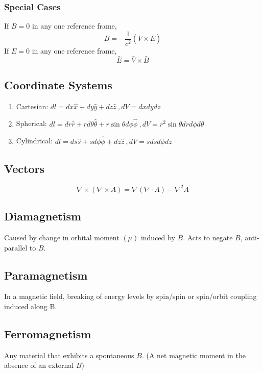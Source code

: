 \documentclass[10pt,letter]{article}
\begin{document}
\subsubsection{Special Cases}
If $B=0$ in any one reference frame, 
\begin{equation}
  \bar{B} = -\frac{1}{c^2}(\bar{V} \times \bar{E})
\end{equation}
If $E=0 $ in any one reference frame,
\begin{equation}
 \bar{E} = \bar{V} \times \bar{B} 
\end{equation}

\subsection{Coordinate Systems}
\begin{enumerate}
    \item Cartesian: $dl = dx\hat{x} + dy\hat{y} + dz\hat{z}~, dV = dxdydz$
    \item Spherical: $dl = dr\hat{r} + rd\theta \hat{\theta} + r\sin \theta d\phi \hat{\phi}~, dV = r^2 \sin \theta dr d\phi d\theta$
    \item Cylindrical: $dl = ds\hat{s} + sd\phi \hat{\phi} + dz\hat{z}~,dV = sdsd\phi dz$
\end{enumerate}

\subsection{Vectors}
\begin{equation}
 \nabla \times (\nabla \times A) = \nabla (\nabla \cdot A) - \nabla^2A 
\end{equation}

\subsection{Diamagnetism}
Caused by change in orbital moment $(\mu)$ induced by $B$. Acts to negate $B$, anti-parallel to $B$.

\subsection{Paramagnetism}
In a magnetic field, breaking of energy levels by spin/spin or spin/orbit coupling induced along B.

\subsection{Ferromagnetism}
Any material that exhibits a spontaneous $B$. (A net magnetic moment in the absence of an external $B$)
\end{document}

